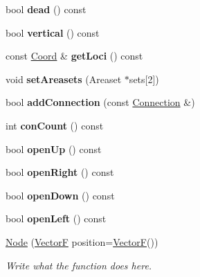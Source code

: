 \begin{DoxyCompactItemize}
\item 
\hypertarget{structNode_abef94e6f9dd2576fe364fd0cb8257d9e}{bool {\bfseries dead} () const }\label{structNode_abef94e6f9dd2576fe364fd0cb8257d9e}

\item 
\hypertarget{structNode_aa76d8f65bb797e4e84a4d9dbdd933294}{bool {\bfseries vertical} () const }\label{structNode_aa76d8f65bb797e4e84a4d9dbdd933294}

\item 
\hypertarget{structNode_aa125f823cfc1231e0ba5f50e6a742db6}{const \hyperlink{structCoord}{Coord} \& {\bfseries get\+Loci} () const }\label{structNode_aa125f823cfc1231e0ba5f50e6a742db6}

\item 
\hypertarget{structNode_a6450dca659f85cd33edbb8910811c9a1}{void {\bfseries set\+Areasets} (Areaset $\ast$sets\mbox{[}2\mbox{]})}\label{structNode_a6450dca659f85cd33edbb8910811c9a1}

\item 
\hypertarget{structNode_a1adae23476112f3cfa2a29e0c43759d3}{bool {\bfseries add\+Connection} (const \hyperlink{structConnection}{Connection} \&)}\label{structNode_a1adae23476112f3cfa2a29e0c43759d3}

\item 
\hypertarget{structNode_adb1a2bb6cbbb29ebecfe7a2ec59955c7}{int {\bfseries con\+Count} () const }\label{structNode_adb1a2bb6cbbb29ebecfe7a2ec59955c7}

\item 
\hypertarget{structNode_aa8e730f4312f3e07855fcad130efd9d9}{bool {\bfseries open\+Up} () const }\label{structNode_aa8e730f4312f3e07855fcad130efd9d9}

\item 
\hypertarget{structNode_a29cd0712d13c59420d4c66269a64c5f1}{bool {\bfseries open\+Right} () const }\label{structNode_a29cd0712d13c59420d4c66269a64c5f1}

\item 
\hypertarget{structNode_a39a07081bb9473f5b7e6f95519e3a6b2}{bool {\bfseries open\+Down} () const }\label{structNode_a39a07081bb9473f5b7e6f95519e3a6b2}

\item 
\hypertarget{structNode_a76dc3334942fd5dd30c650018b4e7d4e}{bool {\bfseries open\+Left} () const }\label{structNode_a76dc3334942fd5dd30c650018b4e7d4e}

\item 
\hyperlink{structNode_a89989d52fa93844ca1be5f0c4f96ae8f}{Node} (\hyperlink{structVectorF}{Vector\+F} position=\hyperlink{structVectorF}{Vector\+F}())
\begin{DoxyCompactList}\small\item\em Write what the function does here. \end{DoxyCompactList}\end{DoxyCompactItemize}
